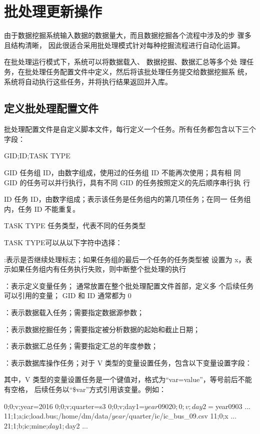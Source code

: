\section{批处理更新操作}
由于数据挖掘系统输入数据的数据量大，而且数据挖掘各个流程中涉及的步
骤多且结构清晰， 因此很适合采用批处理模式针对每种挖掘流程进行自动化运算。

在批处理运行模式下，系统可以将数据载入、 数据挖掘、数据汇总等多个处
理任务，在批处理任务配置文件中定义，然后将该批处理任务提交给数据挖掘系
统，系统将自动执行这些任务，并将执行结果返回并入库。

\subsection{定义批处理配置文件}
批处理配置文件是自定义脚本文件，每行定义一个任务。所有任务都包含以下三个字段：

\begin{scriptcode}
GID;ID;TASK TYPE
\end{scriptcode}

\begin{para}
\item[GID] 任务组 ID，由数字组成，使用过的任务组 ID 不能再次使用；具有相
同 GID 的任务可以并行执行，具有不同 GID 的任务按照定义的先后顺序串行执
行
\item[ID] 任务 ID，由数字组成；表示该任务是任务组内的第几项任务；在同一
任务组内，任务 ID 不能重复。
\item[TASK TYPE] 任务类型，代表不同的任务类型
\end{para}

TASK TYPE可以从以下字符中选择：
\begin{cit}
\item {}:表示是否继续处理标志；如果任务组的最后一个任务的任务类型被
设置为 x，表示如果任务组内有任务执行失败，则中断整个批处理的执行
\item {}：表示定义变量任务； 通常放置在整个批处理配置文件首部，定义多
个后续任务可以引用的变量； GID 和 ID 通常都为 0
\item {}：表示数据载入任务；需要指定数据源参数；
\item {}：表示数据挖掘任务；需要指定被分析数据的起始和截止日期；
\item {}：表示数据汇总任务；需要指定汇总的年度参数；
\item {}：表示数据库操作任务；对于 V 类型的变量设置任务，包含以下变量设置字段：
\end{cit}

其中，V 类型的变量设置任务是一个键值对，格式为“var=value”，等号前后不能有空格，
后续任务以“\${var}”方式引用该变量。例如：

\begin{scriptcode}
0;0;v;year=2016
0;0;v;quarter=s3
0;0;v;day1=${year}0902
0;0;v;day2=${year}0903
...
11;1;a;ic;load.bus;/home/dm/data/${year}/${quarter}/ic/ic_bus_09.csv
11;0;x
...
21;1;b;ic;mine;${day1};${day2}
...
\end{scriptcode}